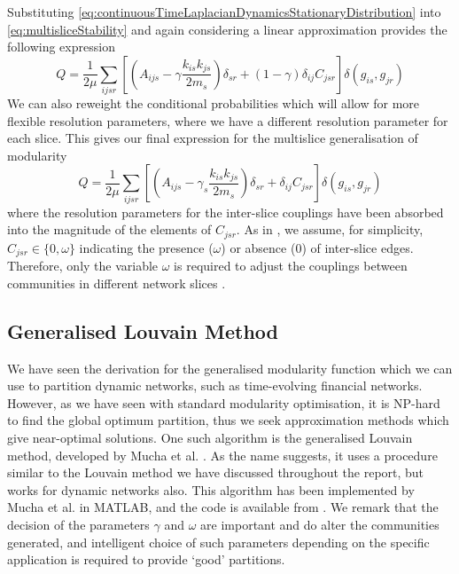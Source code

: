 Substituting \cref{eq:continuousTimeLaplacianDynamicsStationaryDistribution} into \cref{eq:multisliceStability} and again considering a linear approximation provides the following expression
\begin{equation}
	\label{eq:multisliceModularity}
	Q = \frac{1}{2\mu} \sum_{ijsr} \left[ \left( A_{ijs} - \gamma \frac{k_{is}k_{js}}{2m_{s}} \right) \delta_{sr} + (1-\gamma) \delta_{ij} C_{jsr} \right] \delta(g_{is},g_{jr})
\end{equation}
We can also reweight the conditional probabilities which will allow for more flexible resolution parameters, where we have a different resolution parameter for each slice.
This gives our final expression for the multislice generalisation of modularity
\begin{equation}
	\label{eq:multisliceModularityReweighted}
	Q = \frac{1}{2\mu} \sum_{ijsr} \left[ \left( A_{ijs} - \gamma_{s} \frac{k_{is}k_{js}}{2m_{s}} \right) \delta_{sr} + \delta_{ij} C_{jsr} \right] \delta(g_{is},g_{jr})
\end{equation}
where the resolution parameters for the inter-slice couplings have been absorbed into the magnitude of the elements of $C_{jsr}$.
As in \cite{MRM+10}, we assume, for simplicity, $C_{jsr} \in \{ 0,\omega \}$ indicating the presence ($\omega$) or absence (0) of inter-slice edges.
Therefore, only the variable $\omega$ is required to adjust the couplings between communities in different network slices \cite{BPW+13}.


\subsection{Generalised Louvain Method}
\label{subsec:generalisedLouvainMethod}

We have seen the derivation for the generalised modularity function which we can use to partition dynamic networks, such as time-evolving financial networks.
However, as we have seen with standard modularity optimisation, it is NP-hard to find the global optimum partition, thus we seek approximation methods which give near-optimal solutions.
One such algorithm is the generalised Louvain method, developed by Mucha et al. \cite{MRM+10}.
As the name suggests, it uses a procedure similar to the Louvain method we have discussed throughout the report, but works for dynamic networks also.
This algorithm has been implemented by Mucha et al. in MATLAB, and the code is available from \cite{GenLou}.
We remark that the decision of the parameters $\gamma$ and $\omega$ are important and do alter the communities generated, and intelligent choice of such parameters depending on the specific application is required to provide `good' partitions.


